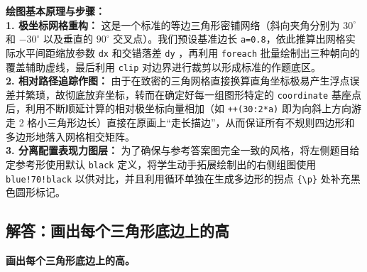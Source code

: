 {\small\color{blue!70!black}
\textbf{绘图基本原理与步骤：}\\
\textbf{1. 极坐标网格重构：} 这是一个标准的等边三角形密铺网络（斜向夹角分别为 $30^\circ$ 和 $-30^\circ$ 以及垂直的 $90^\circ$ 交叉点）。我们预设基准边长 \texttt{a=0.8}，依此推算出网格实际水平间距缩放参数 \texttt{dx} 和交错落差 \texttt{dy} ，再利用 \texttt{foreach} 批量绘制出三种朝向的覆盖辅助虚线，最后利用 \texttt{clip} 对边界进行裁剪以形成标准的作题底区。\\
\textbf{2. 相对路径追踪作图：} 由于在致密的三角网格直接换算直角坐标极易产生浮点误差并繁琐，故彻底放弃坐标，转而在确定好每一组图形特定的 \texttt{coordinate} 基座点后，利用不断顺延计算的相对极坐标向量相加（如 \texttt{++(30:2*a)} 即为向斜上方向游走 2 格小三角形边长）直接在原画上“走长描边”，从而保证所有不规则四边形和多边形地落入网格相交矩阵。\\
\textbf{3. 分离配置表现力图层：} 为了确保与参考答案图完全一致的风格，将左侧题目给定参考形使用默认 \texttt{black} 定义，将学生动手拓展绘制出的右侧组图使用 \texttt{blue!70!black} 以供对比，并且利用循环单独在生成多边形的拐点 \texttt{\{\textbackslash{}p\}} }处补充黑色圆形标记。%
\newpage

\newpage

\subsection{解答：画出每个三角形底边上的高}

\vspace{0.4cm}

\noindent\textbf{画出每个三角形底边上的高。}

\vspace{0.8cm}

